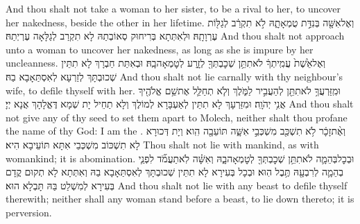 {And thou shalt not take a woman to her sister, to be a rival to her, to uncover her nakedness, beside the other in her lifetime.}{}
{וְאֶל\maqqaf אִשָּׁ֖ה בְּנִדַּ֣ת טֻמְאָתָ֑הּ לֹ֣א תִקְרַ֔ב לְגַלּ֖וֹת עֶרְוָתָֽהּ׃}
{וּלְאִתְּתָא בְּרִיחוּק סְאוֹבְתַהּ לָא תִקְרַב לְגַלָּאָה עֶרְיְתַהּ׃}
{And thou shalt not approach unto a woman to uncover her nakedness, as long as she is impure by her uncleanness.}{}
{וְאֶל\maqqaf אֵ֙שֶׁת֙ עֲמִֽיתְךָ֔ לֹא\maqqaf תִתֵּ֥ן שְׁכׇבְתְּךָ֖ לְזָ֑רַע לְטׇמְאָה\maqqaf בָֽהּ׃}
{וּבְאִתַּת חַבְרָךְ לָא תִתֵּין שְׁכוּבְתָּךְ לְזַרְעָא לְאִסְתַּאָבָא בַהּ׃}
{And thou shalt not lie carnally with thy neighbour’s wife, to defile thyself with her.}{}
{וּמִֽזַּרְעֲךָ֥ לֹא\maqqaf תִתֵּ֖ן לְהַעֲבִ֣יר לַמֹּ֑לֶךְ וְלֹ֧א תְחַלֵּ֛ל אֶת\maqqaf שֵׁ֥ם אֱלֹהֶ֖יךָ אֲנִ֥י יְהֹוָֽה׃}
{וּמִזַּרְעָךְ לָא תִתֵּין לְאַעְבָּרָא לְמוֹלֶךְ וְלָא תַחֵיל יָת שְׁמָא דֶּאֱלָהָךְ אֲנָא יְיָ׃}
{And thou shalt not give any of thy seed to set them apart to Molech, neither shalt thou profane the name of thy God: I am the \lord.}{}
{וְאֶ֨ת\maqqaf זָכָ֔ר לֹ֥א תִשְׁכַּ֖ב מִשְׁכְּבֵ֣י אִשָּׁ֑ה תּוֹעֵבָ֖ה הִֽוא׃}
{וְיָת דְּכוּרָא לָא תִשְׁכּוֹב מִשְׁכְּבֵי אִתָּא תּוֹעֵיבָא הִיא׃}
{Thou shalt not lie with mankind, as with womankind; it is abomination.}{}
{וּבְכׇל\maqqaf בְּהֵמָ֛ה לֹא\maqqaf תִתֵּ֥ן שְׁכׇבְתְּךָ֖ לְטׇמְאָה\maqqaf בָ֑הּ וְאִשָּׁ֗ה לֹֽא\maqqaf תַעֲמֹ֞ד לִפְנֵ֧י בְהֵמָ֛ה לְרִבְעָ֖הּ תֶּ֥בֶל הֽוּא׃}
{וּבְכָל בְּעִירָא לָא תִתֵּין שְׁכוּבְתָּךְ לְאִסְתַּאָבָא בַהּ וְאִתְּתָא לָא תְקוּם קֳדָם בְּעִירָא לְמִשְׁלַט בַּהּ תָּבְלָא הוּא׃}
{And thou shalt not lie with any beast to defile thyself therewith; neither shall any woman stand before a beast, to lie down thereto; it is perversion.}{}
